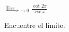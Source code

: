 \setcounter{enumi}{42}
\item $\displaystyle \lim_{x \to 0} \frac{\cot 2x}{\csc x}$
\par
Encuentre el límite.
